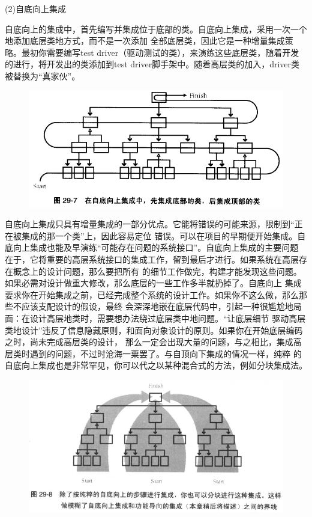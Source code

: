 \documentclass{article}
\begin{document}
\par
(2)自底向上集成
\par
自底向上的集成中，首先编写并集成位于底部的类。自底向上集成，采用一次一个地添加底层类地方式，而不是一次添加
全部底层类，因此它是一种增量集成策略。最初你需要编写test driver（驱动测试的类），来演练这些底层类，随着开发
的进行，将开发出的类添加到test driver脚手架中。随着高层类的加入，driver类被替换为“真家伙”。
\begin{figure}[htb]
    \centering
    \includegraphics[width=15cm]{figure26.png}
\end{figure}
自底向上集成只具有增量集成的一部分优点。它能将错误的可能来源，限制到“正在被集成的那一个类”上，因此容易定位
错误。可以在项目的早期便开始集成。自底向上集成也能及早演练“可能存在问题的系统接口”。自底向上集成的主要问题
在于，它将重要的高层系统接口的集成工作，留到最后才进行。如果系统在高层存在概念上的设计问题，那么要把所有
的细节工作做完，构建才能发现这些问题。如果必需对设计做重大修改，那么底层的一些工作多半就扔掉了。自底向上
集成要求你在开始集成之前，已经完成整个系统的设计工作。如果你不这么做，那么那些不应该支配设计的假设，最终
会深深地嵌在底层代码中，引起一种很尴尬地局面：在设计高层地类时，需要想办法绕过底层类中地问题。“让底层细节
驱动高层类地设计”违反了信息隐藏原则，和面向对象设计的原则。如果你在开始底层编码之时，尚未完成高层类的设计，
那么一定会出现大量的问题，与之相比，集成高层类时遇到的问题，不过时沧海一粟罢了。与自顶向下集成的情况一样，纯粹
的自底向上集成也是非常罕见，你可以代之以某种混合式的方法，例如分块集成法。
\begin{figure}[htb]
    \centering
    \includegraphics[width=15cm]{figure27.png}
\end{figure}
\end{document}

